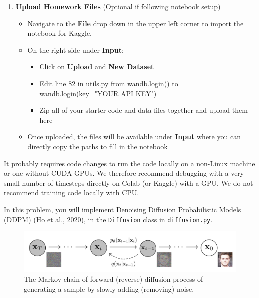 \documentclass[11pt,addpoints,answers]{exam}
\begin{document}
\begin{questions}
\begin{enumerate}
    \item \textbf{Upload Homework Files} (Optional if following notebook setup)
    \begin{itemize}
        \item Navigate to the \textbf{File} drop down in the upper left corner to import the notebook for Kaggle. 
        \item On the right side under \textbf{Input}:
        \begin{itemize}
            \item Click on \textbf{Upload} and \textbf{New Dataset}
            \item Edit line 82 in utils.py from wandb.login() to wandb.login(key="YOUR API KEY")
            \item Zip all of your starter code and data files together and upload them here
        \end{itemize} 
        \item Once uploaded, the files will be available under \textbf{Input} where you can directly copy the paths to fill in the notebook
    \end{itemize}

\end{enumerate}

It probably requires code changes to run the code locally on a non-Linux machine or one without CUDA GPUs. We therefore recommend debugging with a very small number of timesteps directly on Colab (or Kaggle) with a GPU. We do not recommend training code locally with CPU.
\clearpage


    In this problem, you will implement Denoising Diffusion Probabilistic Models (DDPM) \href{https://prompt-to-prompt.github.io/ptp_files/Prompt-to-Prompt_preprint.pdf}{(Ho et al., 2020)}, in the \lstinline{Diffusion} class in \lstinline{diffusion.py}. 
    
    \begin{figure}[H]
        \centering
        \includegraphics[width=.9\linewidth]{fig/diffusion_model.png}
        \caption{The Markov chain of forward (reverse) diffusion process of generating a sample by slowly adding (removing) noise.}
        \label{fig:diffusion}
    \end{figure}


\end{questions}
\end{document}
